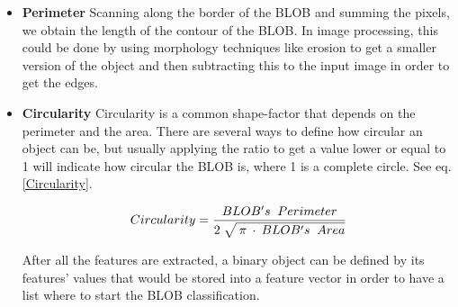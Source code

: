 \begin{itemize}
\item \textbf{Perimeter}
Scanning along the border of the BLOB and summing the pixels, we obtain the length of the contour of the BLOB. In image processing, this could be done by using morphology techniques like erosion to get a smaller version of the object and then subtracting this to the input image in order to get the edges.
\item \textbf{Circularity}
Circularity is a common shape-factor that depends on the perimeter and the area. There are several ways to define how circular an object can be, but usually applying the ratio to get a value lower or equal to 1 will indicate how circular the BLOB is, where 1 is a complete circle. See eq. \ref{Circularity}.

\begin{equation}	
	\begin{aligned}
	{Circularity}=\displaystyle\frac{BLOB's \;\; Perimeter}{2 \; \sqrt{\mathstrut \: \pi \: \cdot \: {BLOB's \;\; Area}}}
	\label{Circularity}
	\end{aligned}
\end{equation}

After all the features are extracted, a binary object can be defined by its features' values that would be stored into a feature vector in order to have a list where to start the BLOB classification.
\end{itemize}


